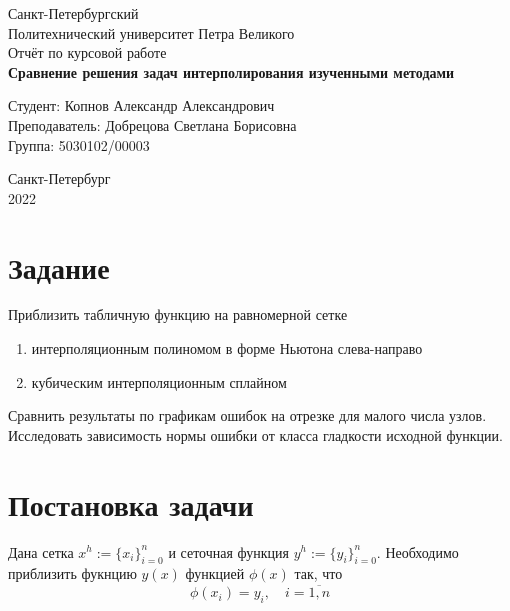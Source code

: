 \documentclass[a4paper]{article}
\begin{document}
\begin{titlepage}
  \Large
  \begin{center}
    Санкт-Петербургский\\
    Политехнический университет Петра Великого\\
    \vspace{10em}
    Отчёт по курсовой работе\\
    \vspace{2em}
    \textbf{Сравнение решения задач интерполирования изученными методами}
  \end{center}
  \vspace{6em}
  \begin{flushright}
    Студент: Копнов Александр Александрович\\
    Преподаватель: Добрецова Светлана Борисовна\\
    Группа: 5030102/00003
  \end{flushright}
  \vspace{\fill}
  \begin{center}
    Санкт-Петербург\\
    2022
  \end{center}
\end{titlepage}

\section{Задание}\label{sec:task}
Приблизить табличную функцию на равномерной сетке
\begin{enumerate}
\item\label{item:1} интерполяционным полиномом в форме Ньютона слева-направо
\item кубическим интерполяционным сплайном
\end{enumerate}
Сравнить результаты по графикам ошибок на отрезке для малого числа узлов. Исследовать зависимость нормы ошибки от класса
гладкости исходной функции.
\section{Постановка задачи}\label{sec:formal}

Дана сетка \(x^{h} := \{x_{i}\}^{n}_{i=0}\) и сеточная функция \(y^{h} := \{y_{i}\}_{i=0}^{n}\). Необходимо приблизить
фукнцию \(y(x)\) функцией \(\phi(x)\) так, что \[
  \phi(x_{i}) = y_{i}, \quad i = \overline{1,n}
\]
\end{document}
